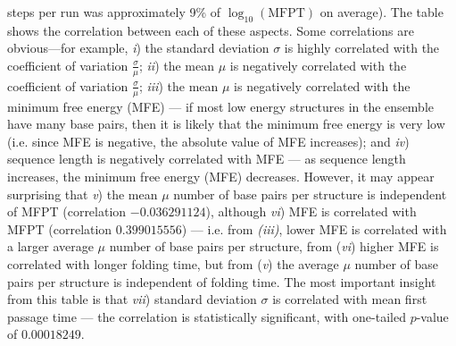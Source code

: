 \begin{landscape}
\begin{table}[!ht]
{steps per run was approximately
9\% of $\log_{10}(\text{MFPT})$ on average). The table shows the correlation between each of these aspects.
Some correlations are obvious---for example,
{\em i})\;
the standard deviation $\sigma$ is highly correlated with the
coefficient of variation $\frac{\sigma}{\mu}$;
{\em ii})\;
the mean $\mu$ is negatively correlated with the
coefficient of variation $\frac{\sigma}{\mu}$;
{\em iii})\;
the mean $\mu$ is negatively correlated with the
minimum free energy (MFE) --- if most low energy structures in the ensemble
have many base pairs, then it is likely that the minimum free energy is very
low (i.e. since MFE is negative, the absolute value of MFE increases); and
{\em iv})\;
sequence length is negatively correlated with MFE --- as sequence length
increases, the minimum free energy (MFE) decreases.
However, it may appear surprising that
{\em v})\; the
mean $\mu$ number of base pairs per structure is independent of MFPT
(correlation $-0.036291124$), although
{\em vi})\; MFE is correlated with MFPT
(correlation $0.399015556$) --- i.e. from {\em (iii)},
lower MFE is correlated with a larger average $\mu$ number of base pairs per
structure, from ({\em vi})
higher MFE is correlated with longer folding time, but
from ({\em v}) the average $\mu$  number of base pairs per structure is
independent of folding time.
The most important insight from this table is that
{\em vii})\;
standard deviation $\sigma$ is correlated with mean first passage
time --- the correlation is statistically significant, with one-tailed
$p$-value of $0.00018249$.}
\label{table:correlationFFTborEmpty}
\end{table}
\end{landscape}

